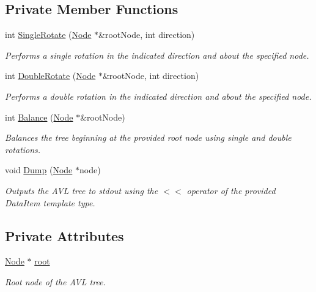 \subsection*{Private Member Functions}
\begin{DoxyCompactItemize}
\item 
int \hyperlink{classAVLTree_ac7ebd1be164c8e1d0eab990e14285957}{Single\-Rotate} (\hyperlink{structAVLTree_1_1Node}{Node} $\ast$\&root\-Node, int direction)
\begin{DoxyCompactList}\small\item\em Performs a single rotation in the indicated direction and about the specified node. \end{DoxyCompactList}\item 
int \hyperlink{classAVLTree_a7e2ed1a8d70f97fc9d4de6d9da4eb729}{Double\-Rotate} (\hyperlink{structAVLTree_1_1Node}{Node} $\ast$\&root\-Node, int direction)
\begin{DoxyCompactList}\small\item\em Performs a double rotation in the indicated direction and about the specified node. \end{DoxyCompactList}\item 
int \hyperlink{classAVLTree_aabcb2e90d12bcb172f728692bce7e7be}{Balance} (\hyperlink{structAVLTree_1_1Node}{Node} $\ast$\&root\-Node)
\begin{DoxyCompactList}\small\item\em Balances the tree beginning at the provided root node using single and double rotations. \end{DoxyCompactList}\item 
void \hyperlink{classAVLTree_aeafa2839058227c9a076d56d7929ebf7}{Dump} (\hyperlink{structAVLTree_1_1Node}{Node} $\ast$node)
\begin{DoxyCompactList}\small\item\em Outputs the A\-V\-L tree to stdout using the $<$$<$ operator of the provided Data\-Item template type. \end{DoxyCompactList}\end{DoxyCompactItemize}
\subsection*{Private Attributes}
\begin{DoxyCompactItemize}
\item 
\hypertarget{classAVLTree_a260b2a142458745acb90c685fc603c95}{\hyperlink{structAVLTree_1_1Node}{Node} $\ast$ \hyperlink{classAVLTree_a260b2a142458745acb90c685fc603c95}{root}}\label{classAVLTree_a260b2a142458745acb90c685fc603c95}

\begin{DoxyCompactList}\small\item\em Root node of the A\-V\-L tree. \end{DoxyCompactList}\end{DoxyCompactItemize}


